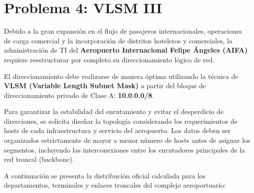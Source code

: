 \section{Problema 4: VLSM III}

\begin{tcolorbox}[enunciado]
Debido a la gran expansión en el flujo de pasajeros internacionales, operaciones de carga comercial y la incorporación de distritos hoteleros y comerciales, la administración de TI del \textbf{Aeropuerto Internacional Felipe Ángeles (AIFA)} requiere reestructurar por completo su direccionamiento lógico de red.

El direccionamiento debe realizarse de manera óptima utilizando la técnica de \textbf{VLSM (Variable Length Subnet Mask)} a partir del bloque de direccionamiento privado de Clase A: \textbf{10.0.0.0/8}.

Para garantizar la estabilidad del enrutamiento y evitar el desperdicio de direcciones, se solicita diseñar la topología considerando los requerimientos de hosts de cada infraestructura y servicio del aeropuerto. Los datos deben ser organizados estrictamente de mayor a menor número de hosts antes de asignar los segmentos, incluyendo las interconexiones entre los enrutadores principales de la red troncal (backbone).

A continuación se presenta la distribución oficial calculada para los departamentos, terminales y enlaces troncales del complejo aeroportuario:


\end{tcolorbox}
